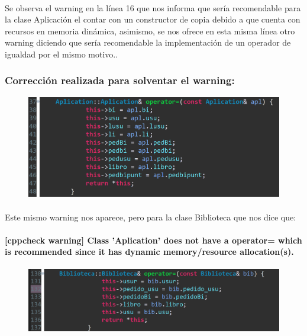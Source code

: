 			\paragraph{}Se observa el warning en la línea 16 que nos informa que sería recomendable para la clase Aplicación el contar con un constructor de copia debido a que cuenta con recursos en memoria dinámica, asimismo, se nos ofrece en esta misma línea otro warning diciendo que sería recomendable la implementación de un operador de igualdad por el mismo motivo..
			
		\subsubsection{Corrección realizada para solventar el warning:}
		
			\begin{figure}[H]
				\centering
				\includegraphics[scale=0.55]{img/esteban30.png}
				\label{esteban30}
			\end{figure}
		
			\paragraph{}Este mismo warning nos aparece, pero para la clase Biblioteca que nos dice que:
			
			\paragraph{[cppcheck warning] Class 'Aplication' does not have a operator= which is recommended since it has dynamic memory/resource allocation(s).}
			
			\begin{figure}[H]
				\centering
				\includegraphics[scale=0.55]{img/esteban31.png}
				\label{esteban31}
			\end{figure}
			
